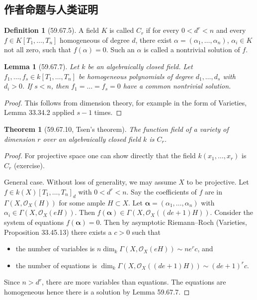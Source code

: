 \documentclass[UTF8,11pt]{ctexart}
\newtheorem*{theorem}{Theorem}
\newtheorem*{lemma}{Lemma}
\theoremstyle{definition}
\newtheorem*{definition}{Definition}
\begin{document}
\subsection*{作者命题与人类证明}
\begin{definition}[59.67.5]
A field $K$ is called $C_r$ if for every $0<d^r<n$ and every $f\in K[T_1,\ldots,T_n]$ homogeneous of degree $d$, there exist $\alpha=(\alpha_1,\ldots,\alpha_n)$, $\alpha_i\in K$ not all zero, such that $f(\alpha)=0$. Such an $\alpha$ is called a nontrivial solution of $f$.
\end{definition}
\begin{lemma}[59.67.7]
Let $k$ be an algebraically closed field. Let $f_1,\ldots,f_s\in k[T_1,\ldots,T_n]$ be homogeneous polynomials of degree $d_1,\ldots,d_s$ with $d_i>0$. If $s<n$, then $f_1=\ldots=f_s=0$ have a common nontrivial solution.
\end{lemma}
\begin{proof}
This follows from dimension theory, for example in the form of Varieties, Lemma 33.34.2 applied $s-1$ times.
\end{proof}
\begin{theorem}[59.67.10, Tsen's theorem]
The function field of a variety of dimension $r$ over an algebraically closed field $k$ is $C_r$.
\end{theorem}
\begin{proof}
For projective space one can show directly that the field $k(x_1,\ldots,x_r)$ is $C_r$ (exercise).

General case. Without loss of generality, we may assume $X$ to be projective. Let $f\in k(X)[T_1,\ldots,T_n]_d$ with $0<d^r<n$. Say the coefficients of $f$ are in $\Gamma(X,\mathcal O_X(H))$ for some ample $H\subset X$. Let $\boldsymbol\alpha=(\alpha_1,\ldots,\alpha_n)$ with $\alpha_i\in\Gamma(X,\mathcal O_X(eH))$. Then $f(\boldsymbol\alpha)\in\Gamma(X,\mathcal O_X((de+1)H))$. Consider the system of equations $f(\boldsymbol\alpha)=0$. Then by asymptotic Riemann--Roch (Varieties, Proposition 33.45.13) there exists a $c>0$ such that
\begin{itemize}
\item the number of variables is $n\dim_k\Gamma(X,\mathcal O_X(eH))\sim ne^rc$, and
\item the number of equations is $\dim_k\Gamma(X,\mathcal O_X((de+1)H))\sim(de+1)^rc$.
\end{itemize}
Since $n>d^r$, there are more variables than equations. The equations are homogeneous hence there is a solution by Lemma 59.67.7.
\end{proof}
\end{document}
